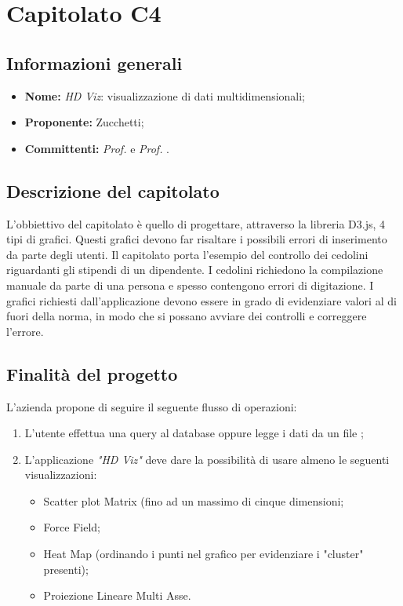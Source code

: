 \section{Capitolato C4}

\subsection{Informazioni generali}
\begin{itemize}
\item \textbf{Nome:} \textit{HD Viz}:  visualizzazione di dati multidimensionali;
\item \textbf{Proponente:} Zucchetti;
\item \textbf{Committenti:} \textit{Prof. \Tullio{}} e \textit{Prof. \Riccardo{}}.
\end{itemize}

\subsection{Descrizione del capitolato}
L'obbiettivo del capitolato è quello di progettare, attraverso la libreria D3.js, 4 tipi di grafici. Questi grafici devono far risaltare i possibili errori di inserimento da parte degli utenti.
Il capitolato porta l'esempio del controllo dei cedolini riguardanti gli stipendi di un dipendente. I cedolini richiedono la compilazione manuale da parte di una persona e spesso contengono errori di digitazione. I grafici richiesti dall'applicazione devono essere in grado di evidenziare valori al di fuori della norma, in modo che si possano avviare dei controlli e correggere l'errore.

\subsection{Finalità del progetto}
L'azienda propone di seguire il seguente flusso di operazioni:
\begin{enumerate}
\item L'utente effettua una query al database oppure legge i dati da un file ;
\item L'applicazione \textit{"HD Viz"} deve dare la possibilità di usare almeno le seguenti visualizzazioni:
    \begin{itemize}
    \item Scatter plot Matrix (fino ad un massimo di cinque dimensioni;
    \item Force Field;
    \item Heat Map (ordinando i punti nel grafico per evidenziare i "cluster" presenti);
    \item Proiezione Lineare Multi Asse.
    \end{itemize}
\end{enumerate}


